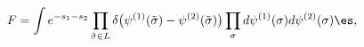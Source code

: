 \begin{equation}
F= \int e^{-s_1 -s_2} \prod_{\tilde{\sigma} \in L} \delta \bigl( \psi^{(1)} 
(\tilde{\sigma}) - \psi^{(2)} (\tilde{\sigma}) \bigr) \prod_\sigma d 
\psi^{(1)} (\sigma)d \psi^{(2)} (\sigma) \es, 
\end{equation}

